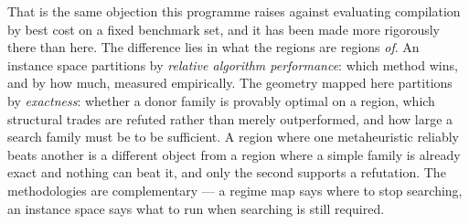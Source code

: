 That is the same objection this programme raises against evaluating compilation by best cost on a fixed benchmark set, and it has been made more rigorously there than here. The difference lies in what the regions are regions \emph{of}. An instance space partitions by \emph{relative algorithm performance}: which method wins, and by how much, measured empirically. The geometry mapped here partitions by \emph{exactness}: whether a donor family is provably optimal on a region, which structural trades are refuted rather than merely outperformed, and how large a search family must be to be sufficient. A region where one metaheuristic reliably beats another is a different object from a region where a simple family is already exact and nothing can beat it, and only the second supports a refutation. The methodologies are complementary --- a regime map says where to stop searching, an instance space says what to run when searching is still required.

